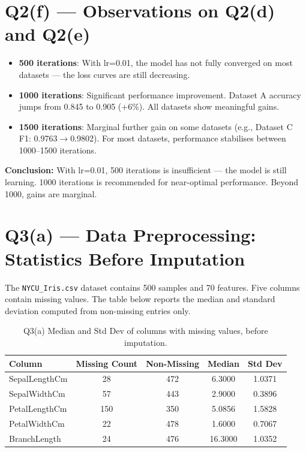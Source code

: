 \documentclass{article}
\begin{document}
\newpage
\section{Q2(f) --- Observations on Q2(d) and Q2(e)}

\begin{itemize}
    \item \textbf{500 iterations}: With lr=0.01, the model has not fully converged on most datasets --- the loss curves are still decreasing.
    \item \textbf{1000 iterations}: Significant performance improvement. Dataset A accuracy jumps from 0.845 to 0.905 (+6\%). All datasets show meaningful gains.
    \item \textbf{1500 iterations}: Marginal further gain on some datasets (e.g., Dataset C F1: 0.9763$\to$0.9802). For most datasets, performance stabilises between 1000--1500 iterations.
\end{itemize}

\textbf{Conclusion:} With lr=0.01, 500 iterations is insufficient --- the model is still learning. 1000 iterations is recommended for near-optimal performance. Beyond 1000, gains are marginal.

\newpage
\section{Q3(a) --- Data Preprocessing: Statistics Before Imputation}

The \texttt{NYCU\_Iris.csv} dataset contains 500 samples and 70 features. Five columns contain missing values. The table below reports the median and standard deviation computed from non-missing entries only.

\begin{table}[H]\centering
\begin{tabular}{lcccc}\toprule
\textbf{Column} & \textbf{Missing Count} & \textbf{Non-Missing} & \textbf{Median} & \textbf{Std Dev} \\\midrule
SepalLengthCm & 28  & 472 & 6.3000  & 1.0371 \\
SepalWidthCm  & 57  & 443 & 2.9000  & 0.3896 \\
PetalLengthCm & 150 & 350 & 5.0856  & 1.5828 \\
PetalWidthCm  & 22  & 478 & 1.6000  & 0.7067 \\
BranchLength  & 24  & 476 & 16.3000 & 1.0352 \\
\bottomrule\end{tabular}
\caption{Q3(a) Median and Std Dev of columns with missing values, before imputation.}
\end{table}
\end{document}
